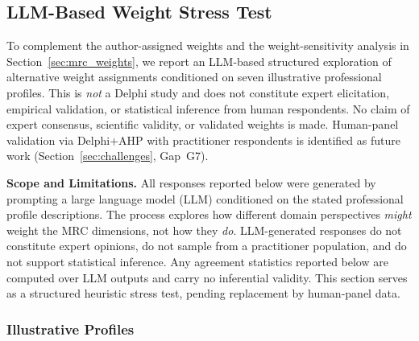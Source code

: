 
\subsection{LLM-Based Weight Stress Test}
\label{sec:mrc_delphi}

To complement the author-assigned weights and the weight-sensitivity analysis
in Section~\ref{sec:mrc_weights}, we report an LLM-based structured
exploration of alternative weight assignments conditioned on seven
illustrative professional profiles. This is \emph{not} a Delphi study and
does not constitute expert elicitation, empirical validation, or statistical
inference from human respondents. No claim of expert consensus, scientific
validity, or validated weights is made. Human-panel validation via
Delphi+AHP with practitioner respondents is identified as future work
(Section~\ref{sec:challenges}, Gap~G7).

\begin{mdframed}[backgroundcolor=orange!6,linecolor=orange!50,linewidth=0.8pt,
  innertopmargin=5pt,innerbottommargin=5pt]
\small\textbf{Scope and Limitations.}
All responses reported below were generated by prompting a large language
model (LLM) conditioned on the stated professional profile descriptions.
The process explores how different domain perspectives \emph{might} weight
the MRC dimensions, not how they \emph{do}. LLM-generated responses do not
constitute expert opinions, do not sample from a practitioner population,
and do not support statistical inference. Any agreement statistics
reported below are computed over LLM outputs and carry no inferential
validity. This section serves as a structured heuristic stress test,
pending replacement by human-panel data.
\end{mdframed}

\subsubsection*{Illustrative Profiles}

